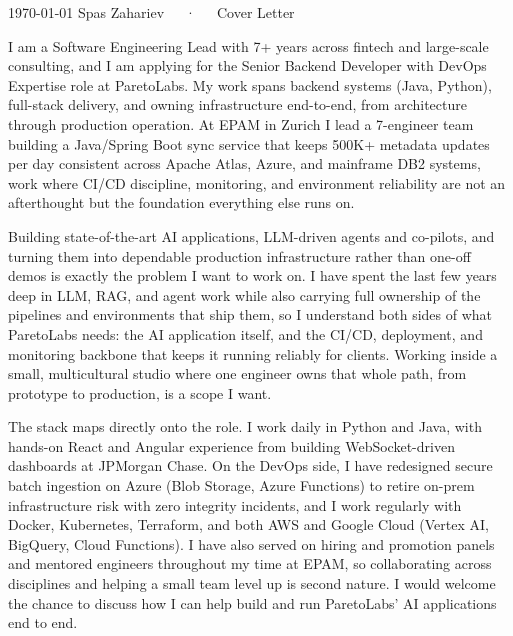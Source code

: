 \documentclass[11pt, a4paper]{awesome-cv}
\begin{document}
\makecvheader[R]

\makecvfooter
  {\today}
  {Spas Zahariev~~~·~~~Cover Letter}
  {}

\makelettertitle

\begin{cvletter}

I am a Software Engineering Lead with 7+ years across fintech and large-scale consulting, and I am applying for the Senior Backend Developer with DevOps Expertise role at ParetoLabs. My work spans backend systems (Java, Python), full-stack delivery, and owning infrastructure end-to-end, from architecture through production operation. At EPAM in Zurich I lead a 7-engineer team building a Java/Spring Boot sync service that keeps 500K+ metadata updates per day consistent across Apache Atlas, Azure, and mainframe DB2 systems, work where CI/CD discipline, monitoring, and environment reliability are not an afterthought but the foundation everything else runs on.

Building state-of-the-art AI applications, LLM-driven agents and co-pilots, and turning them into dependable production infrastructure rather than one-off demos is exactly the problem I want to work on. I have spent the last few years deep in LLM, RAG, and agent work while also carrying full ownership of the pipelines and environments that ship them, so I understand both sides of what ParetoLabs needs: the AI application itself, and the CI/CD, deployment, and monitoring backbone that keeps it running reliably for clients. Working inside a small, multicultural studio where one engineer owns that whole path, from prototype to production, is a scope I want.

The stack maps directly onto the role. I work daily in Python and Java, with hands-on React and Angular experience from building WebSocket-driven dashboards at JPMorgan Chase. On the DevOps side, I have redesigned secure batch ingestion on Azure (Blob Storage, Azure Functions) to retire on-prem infrastructure risk with zero integrity incidents, and I work regularly with Docker, Kubernetes, Terraform, and both AWS and Google Cloud (Vertex AI, BigQuery, Cloud Functions). I have also served on hiring and promotion panels and mentored engineers throughout my time at EPAM, so collaborating across disciplines and helping a small team level up is second nature. I would welcome the chance to discuss how I can help build and run ParetoLabs' AI applications end to end.

\end{cvletter}


\makeletterclosing
\end{document}
